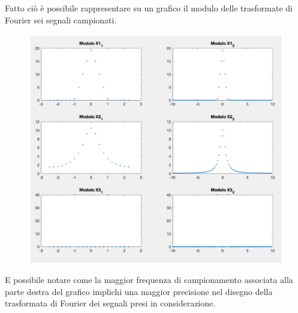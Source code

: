 \bigskip

Fatto ciò è possibile rappresentare su un graﬁco il modulo delle trasformate 
di Fourier sei segnali campionati.

\begin{figure}[H]
	\centering
	\includegraphics[width=.7\textwidth]{./images/cap3/segnali_campionati.png}
\end{figure}

E possibile notare come la maggior frequenza di campionamento associata alla 
parte destra del graﬁco implichi una maggior precisione nel disegno della 
trasformata di Fourier dei segnali presi in considerazione.